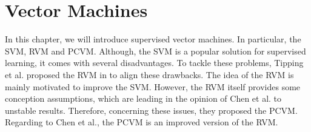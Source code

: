 \chapter{Vector Machines}\label{Pc}
In this chapter, we will introduce supervised vector machines.
In particular, the \ac{SVM}, \ac{RVM} and \ac{PCVM}.
Although, the \acs{SVM} is a popular solution for supervised learning, it comes with several disadvantages.\cite{Chen.2009}
To tackle these problems, Tipping et al. proposed the \acs{RVM} in \cite{Tipping.2001} to align these drawbacks.
The idea of the \acs{RVM} is mainly motivated to improve the \acs{SVM}\cite[p. 1-2]{Tipping.2001}.
However, the \acs{RVM} itself provides some conception assumptions, which are leading in the opinion of Chen et al. to unstable results.
Therefore, concerning these issues, they proposed the \acs{PCVM}.
Regarding to Chen et al., the \acs{PCVM} is an improved version of the \acs{RVM}.\cite{Chen.2009}
